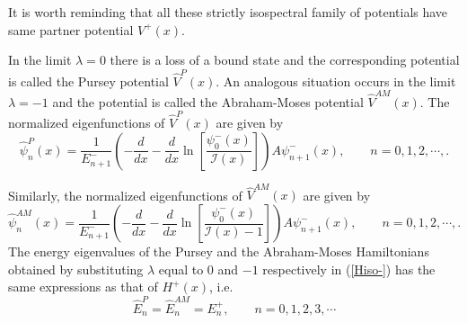 \documentclass[11pt]{article}
\begin{document}
It is worth reminding that all these strictly isospectral family of potentials 
have same partner potential $V^+(x)$.

In the limit \( \lambda=0 \) there is a loss of a bound state and the 
corresponding potential is called the Pursey potential \( \hat{V}^{P}(x) \). 
An analogous situation occurs in the limit \( \lambda=-1 \) and the potential 
is called the Abraham-Moses potential \( \hat{V}^{AM}(x) \). 
The normalized eigenfunctions of \( \hat{V}^{P}(x) \) are given by
\begin{equation}
\hat{\psi}^{P}_{n}(x)=\frac{1}{E^-_{n+1}} \left(-\frac{d}{dx}-\frac{d}{dx}\ln\left[\frac{\psi^-_{0}(x)}{\mathcal{I}(x)}\right]\right)A\psi^-_{n+1}(x),\qquad n=0,1,2,\cdots,\label{P}.
\end{equation}

Similarly, the normalized eigenfunctions of \( \hat{V}^{AM}(x) \) are given by
\begin{equation}
\hat{\psi}^{AM}_{n}(x)=\frac{1}{E^-_{n+1}} \left(-\frac{d}{dx}-\frac{d}{dx}\ln\left[\frac{\psi^-_{0}(x)}{\mathcal{I}(x)-1}\right]\right)A\psi^-_{n+1}(x),\qquad n=0,1,2,\cdots,\label{AM}.
\end{equation}
The energy eigenvalues of the Pursey and the Abraham-Moses Hamiltonians obtained by substituting \( \lambda \) equal to \( 0 \) and \( -1 \) respectively in (\ref{Hiso-}) has the same expressions as that of $H^{+}(x)$, i.e.
\begin{equation}
\hat{E}^{P}_{n}=\hat{E}^{AM}_{n}=E^+_{n},\qquad n=0,1,2,3,\cdots\label{E-pam}
\end{equation}
\end{document}
